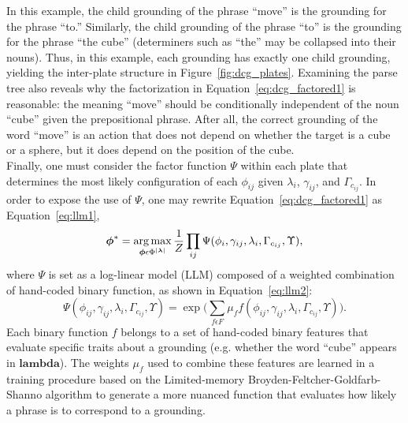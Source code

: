 In this example, the child grounding of the phrase ``move'' is the grounding for the phrase ``to.''
Similarly, the child grounding of the phrase ``to'' is the grounding for the phrase ``the cube'' (determiners such as ``the'' may be collapsed into their nouns).
Thus, in this example, each grounding has exactly one child grounding, yielding the inter-plate structure in Figure~\ref{fig:dcg_plates}.
Examining the parse tree also reveals why the factorization in Equation~\ref{eq:dcg_factored1} is reasonable: the meaning ``move'' should be conditionally independent of the noun ``cube'' given the prepositional phrase.
After all, the correct grounding of the word ``move'' is an action that does not depend on whether the target is a cube or a sphere, but it does depend on the position of the cube.\\
\indent Finally, one must consider the factor function $\Psi$ within each plate that determines the most likely configuration of each $\phi_{ij}$ given $\lambda_i$, $\gamma_{ij}$, and $\Gamma_{c_{ij}}$.
In order to expose the use of $\Psi$, one may rewrite Equation~\ref{eq:dcg_factored1} as Equation~\ref{eq:llm1}, \\
\begin{equation}
\boldsymbol{\phi}^* = \operatorname*{\arg\max}_{\boldsymbol{\phi} \epsilon \Phi^{|\boldsymbol{\lambda}|}} \frac{1}{Z} \prod_{ij} \Psi(\phi_i,\gamma_{ij},\lambda_i,\Gamma_{c_{ij}},\Upsilon),
\label{eq:llm1}
\end{equation}
where $\Psi$ is set as a log-linear model (LLM) composed of a weighted combination of hand-coded binary function, as shown in Equation~\ref{eq:llm2}:
\begin{equation}
\Psi(\phi_{ij},\gamma_{ij},\lambda_i,\Gamma_{c_{ij}},\Upsilon) = \exp \Big( \sum_{f \epsilon F} \mu_f f(\phi_{ij},\gamma_{ij},\lambda_i,\Gamma_{c_{ij}},\Upsilon) \Big)
\label{eq:llm2}.
\end{equation}
\indent Each binary function $f$ belongs to a set of hand-coded binary features that evaluate specific traits about a grounding (e.g. whether the word ``cube'' appears in $\boldsymbol{lambda}$).
The weights $\mu_f$ used to combine these features are learned in a training procedure based on the Limited-memory Broyden-Feltcher-Goldfarb-Shanno algorithm to generate a more nuanced function that evaluates how likely a phrase is to correspond to a grounding.
